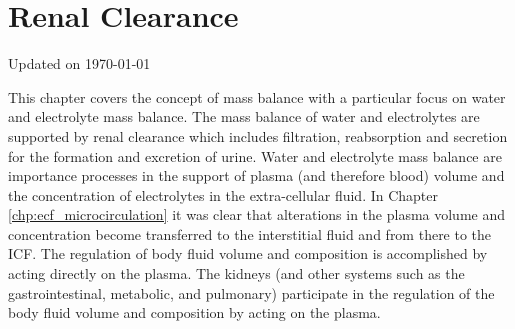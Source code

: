 \chapter{Renal Clearance}\label{chp:blood_content}
Updated on \today
\minitoc

This chapter covers the concept of mass balance with a particular focus on water and electrolyte mass balance. The mass balance of water and electrolytes are supported by renal clearance which includes filtration, reabsorption and secretion for the formation and excretion of urine. Water and electrolyte mass balance are importance processes in the support of plasma (and therefore blood) volume and the concentration of electrolytes in the extra-cellular fluid. In Chapter \ref{chp:ecf_microcirculation} it was clear that alterations in the plasma volume and concentration become transferred to the interstitial fluid and from there to the ICF. The regulation of body fluid volume and composition is accomplished by acting directly on the plasma. The kidneys (and other systems such as the gastrointestinal, metabolic, and pulmonary) participate in the regulation of the body fluid volume and composition by acting on the plasma.

\vspace{5mm}


